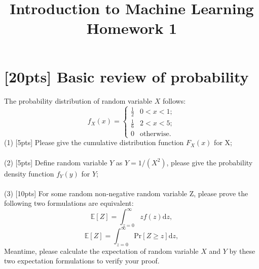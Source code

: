 \documentclass{article}
\title{Introduction to Machine Learning\\Homework 1}
\begin{document}
	\maketitle
	
	\section{[20pts] Basic review of probability}
	The probability distribution of random variable $X$ follows:\\
	\begin{equation}
	f_X(x)=\begin{cases}
	\frac{1}{2} & 0<x<1;\\
	\frac{1}{6} & 2<x<5;\\
	0 & \text{otherwise}.
	\end{cases}
	\end{equation} 
	(1) [5pts] Please give the cumulative distribution function $F_X(x)$ for X;\\ \\ 
	(2) [5pts] Define random variable $Y$ as $Y=1/(X^2)$, please give the probability density function $f_Y(y)$ for $Y$;\\ \\
	(3) [10pts] For some random non-negative random variable Z, please prove the following two formulations are equivalent:\\
	\begin{equation}
	\mathbb{E}[Z]=\int^\infty_{z=0} z f(z)\mathrm{d}z,
	\end{equation}
	\begin{equation}
	\mathbb{E}[Z]=\int^\infty_{z=0} \mathrm{Pr}[Z\geq z]\mathrm{d}z,
	\end{equation}
	Meantime, please calculate the expectation of random variable $X$ and $Y$ by these two expectation formulations to verify your proof.
	\newpage
\end{document}
